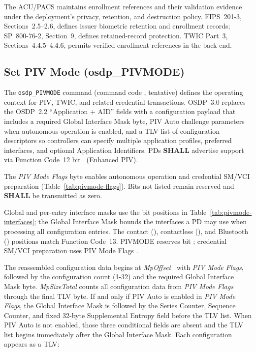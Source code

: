The ACU/PACS maintains enrollment references and their validation evidence under
the deployment's privacy, retention, and destruction policy. FIPS~201-3,
Sections~2.5--2.6, defines issuer biometric retention and enrollment records;
SP~800-76-2, Section~9, defines retained-record protection. TWIC Part~3,
Sections~4.4.5--4.4.6, permits verified enrollment references in the back end.

\subsection{Set PIV Mode (osdp\_PIVMODE)}\label{sec:pivmode}

The \texttt{osdp\_PIVMODE} command (command code , tentative) defines the operating context for PIV, TWIC, and related credential transactions. OSDP~3.0 replaces the OSDP~2.2 “Application + AID” fields with a configuration payload that includes a required Global Interface Mask byte, PIV Auto challenge parameters when autonomous operation is enabled, and a TLV list of configuration descriptors so controllers can specify multiple application profiles, preferred interfaces, and optional Application Identifiers. PDs \textbf{SHALL} advertise support via Function Code~12 bit~ (Enhanced PIV).



The \emph{PIV Mode Flags} byte enables autonomous operation and credential SM/VCI
preparation (Table~\ref{tab:pivmode-flags}). Bits not listed remain reserved and
\textbf{SHALL} be transmitted as zero.



Global and per-entry interface masks use the bit positions in Table~\ref{tab:pivmode-interfaces}; the Global Interface Mask bounds the interfaces a PD may use when processing all configuration entries.
The contact (), contactless (), and Bluetooth
() positions match Function Code~13. PIVMODE reserves bit
; credential SM/VCI preparation uses PIV Mode Flags .



The reassembled configuration data begins at \emph{MpOffset}~ with
\emph{PIV Mode Flags}, followed by the configuration count (1-32) and the required Global
Interface Mask byte. \emph{MpSizeTotal} counts all configuration data from \emph{PIV Mode
Flags} through the final TLV byte. If and only if PIV Auto is enabled in \emph{PIV Mode Flags},
the Global Interface Mask is followed by the Series Counter, Sequence Counter, and fixed
32-byte Supplemental Entropy field before the TLV list. When PIV Auto is not enabled, those
three conditional fields are absent and the TLV list begins immediately after the Global
Interface Mask. Each configuration appears as a TLV:

